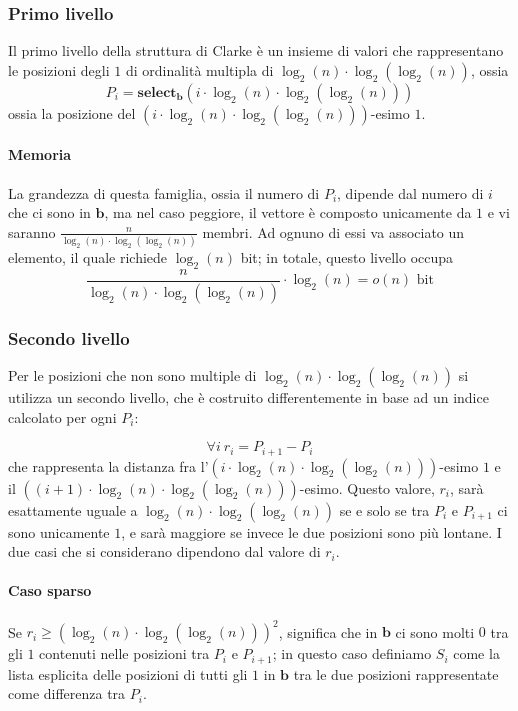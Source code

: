 \subsubsection{Primo livello}
Il primo livello della struttura di Clarke è un insieme
di valori che rappresentano le posizioni degli $1$ di ordinalità multipla di
$\log_2(n) \cdot \log_2(\log_2(n))$, ossia
$$
	P_i =  \mathbf{select_b}(i \cdot \log_2(n) \cdot \log_2(\log_2(n)))
$$
ossia la posizione del $(i \cdot \log_2(n) \cdot \log_2(\log_2(n)))$-esimo $1$.

\paragraph{Memoria}
La grandezza di questa famiglia, ossia il numero di $P_i$, dipende dal
numero di $i$ che ci sono in $\mathbf{b}$, ma nel caso peggiore, il vettore
è composto unicamente da $1$ e vi saranno $\frac{n}{\log_2(n) \cdot \log_2(\log_2(n))}$ membri.
Ad ognuno di essi va associato un elemento, il quale richiede $\log_2(n)$ bit;
in totale, questo livello occupa
$$
	\frac{n}{\log_2(n) \cdot \log_2(\log_2(n))} \cdot \log_2(n) = o(n) \text{ bit}
$$

\subsubsection{Secondo livello}
Per le posizioni che non sono multiple di $\log_2(n) \cdot \log_2(\log_2(n))$ si utilizza
un secondo livello, che è costruito differentemente in base ad un indice calcolato
per ogni $P_i$:

$$
	\forall i ~ r_i = P_{i + 1} - P_i
$$
che rappresenta la distanza fra l'$(i \cdot \log_2(n) \cdot \log_2(\log_2(n)))$-esimo $1$
e il $((i+1) \cdot \log_2(n) \cdot \log_2(\log_2(n)))$-esimo. Questo
valore, $r_i$, sarà esattamente uguale a $\log_2(n) \cdot \log_2(\log_2(n))$ se e solo se
tra $P_{i}$ e $P_{i+1}$ ci sono unicamente $1$, e sarà maggiore se invece le
due posizioni sono più lontane.
I due casi che si considerano dipendono dal valore di $r_i$.

\paragraph{Caso sparso}
Se $r_i \geq (\log_2(n) \cdot \log_2(\log_2(n)))^2$, significa che in $\mathbf{b}$ ci
sono molti $0$ tra gli $1$ contenuti nelle posizioni tra $P_{i}$ e $P_{i+1}$; in questo caso
definiamo $S_i$ come la lista esplicita delle posizioni di tutti gli $1$
in $\mathbf{b}$ tra le due posizioni rappresentate come differenza tra $P_i$.

